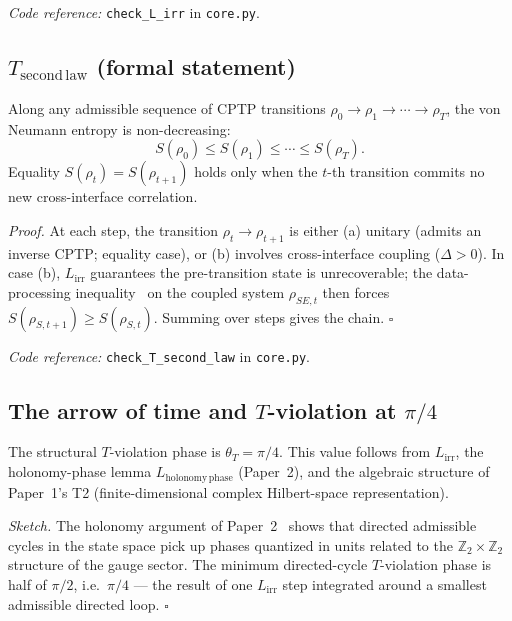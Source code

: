 \documentclass[11pt]{article}
\theoremstyle{remark}
\newcommand{\coderef}[2]{\smallskip\noindent\textit{Code reference:} \texttt{#1} in \texttt{#2}.}
\begin{document}
\coderef{check\_L\_irr}{core.py}

\subsection{$T_{\mathrm{second\,law}}$ (formal statement)}

\begin{tcolorbox}[apfbox, title={Theorem 5.2 ($T_{\mathrm{second\,law}}$)}]
Along any admissible sequence of CPTP transitions
$\rho_0 \to \rho_1 \to \cdots \to \rho_T$, the von Neumann entropy is
non-decreasing:
\[
S(\rho_0) \le S(\rho_1) \le \cdots \le S(\rho_T).
\]
Equality $S(\rho_t) = S(\rho_{t+1})$ holds only when the $t$-th transition
commits no new cross-interface correlation.
\end{tcolorbox}

\textit{Proof.}  At each step, the transition $\rho_t \to \rho_{t+1}$ is
either (a) unitary (admits an inverse CPTP; equality case), or (b) involves
cross-interface coupling ($\Delta > 0$).  In case (b), $L_{\mathrm{irr}}$
guarantees the pre-transition state is unrecoverable; the data-processing
inequality~\cite{LiebRuskai1973,Wehrl1978} on the coupled system
$\rho_{SE,t}$ then forces $S(\rho_{S,t+1}) \geq S(\rho_{S,t})$.  Summing
over steps gives the chain.  \hfill$\square$

\coderef{check\_T\_second\_law}{core.py}

\subsection{The arrow of time and $T$-violation at $\pi/4$}

\begin{tcolorbox}[apfbox, title={Theorem 5.3 ($T_{\mathrm{CPT}}$)}]
The structural $T$-violation phase is $\theta_T = \pi/4$.  This value
follows from $L_{\mathrm{irr}}$, the holonomy-phase lemma
$L_{\mathrm{holonomy\,phase}}$ (Paper~2), and the algebraic structure of
Paper~1's T2 (finite-dimensional complex Hilbert-space representation).
\end{tcolorbox}

\textit{Sketch.}  The holonomy argument of Paper~2~\cite{Paper2} shows
that directed admissible cycles in the state space pick up phases
quantized in units related to the $\mathbb{Z}_2 \times \mathbb{Z}_2$
structure of the gauge sector.  The minimum directed-cycle $T$-violation
phase is half of $\pi/2$, i.e.\ $\pi/4$ --- the result of one $L_{\mathrm{irr}}$
step integrated around a smallest admissible directed loop.  \hfill$\square$
\end{document}
